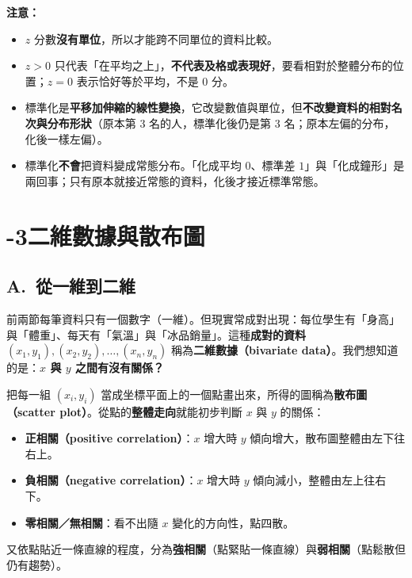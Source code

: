 \documentclass[11pt]{article}
\begin{document}
\textbf{注意：}
\begin{itemize}\setlength{\itemsep}{2pt}
\item $z$ 分數\textbf{沒有單位}，所以才能跨不同單位的資料比較。
\item $z>0$ 只代表「在平均之上」，\textbf{不代表及格或表現好}，要看相對於整體分布的位置；$z=0$ 表示恰好等於平均，不是 $0$ 分。
\item 標準化是\textbf{平移加伸縮的線性變換}，它改變數值與單位，但\textbf{不改變資料的相對名次與分布形狀}（原本第 3 名的人，標準化後仍是第 3 名；原本左偏的分布，化後一樣左偏）。
\item 標準化\textbf{不會}把資料變成常態分布。「化成平均 $0$、標準差 $1$」與「化成鐘形」是兩回事；只有原本就接近常態的資料，化後才接近標準常態。
\end{itemize}

\section*{-3\quad 二維數據與散布圖}

\subsection*{\sffamily A.\ 從一維到二維}

前兩節每筆資料只有一個數字（一維）。但現實常成對出現：每位學生有「身高」與「體重」、每天有「氣溫」與「冰品銷量」。這種\textbf{成對的資料}$(x_1,y_1),(x_2,y_2),\dots,(x_n,y_n)$ 稱為\textbf{二維數據（bivariate data）}。我們想知道的是：\textbf{$x$ 與 $y$ 之間有沒有關係？}

把每一組 $(x_i, y_i)$ 當成坐標平面上的一個點畫出來，所得的圖稱為\textbf{散布圖（scatter plot）}。從點的\textbf{整體走向}就能初步判斷 $x$ 與 $y$ 的關係：

\begin{itemize}\setlength{\itemsep}{2pt}
\item \textbf{正相關（positive correlation）}：$x$ 增大時 $y$ 傾向增大，散布圖整體由左下往右上。
\item \textbf{負相關（negative correlation）}：$x$ 增大時 $y$ 傾向減小，整體由左上往右下。
\item \textbf{零相關／無相關}：看不出隨 $x$ 變化的方向性，點四散。
\end{itemize}

又依點貼近一條直線的程度，分為\textbf{強相關}（點緊貼一條直線）與\textbf{弱相關}（點鬆散但仍有趨勢）。

\end{document}
